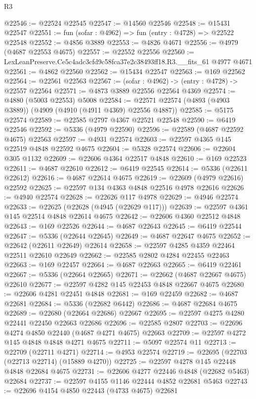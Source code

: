 \begin{lexlean}{R3}
\begin{coremodule}
@22546 := @22524 @22545
@22547 := @14560 @22546
@22548 := @15431 @22547
@22551 := fun (sofar : @4962) => fun (entry : @4728) => @22522 @22548
@22552 := @4856 @3889
@22553 := @4826 @4671
@22556 := @4979 (@4687 @22553 @4675)
@22557 := @22552 @22556
@22560 := LexLeanPreserve.Ce5c4adc3cfd9c58fca37e2c38493ff18.R3.__fits_61 @4977 @4671
@22561 := @4862 @22560
@22562 := @15434 @22547
@22563 := @169 @22562
@22564 := @22561 @22563
@22567 := (sofar : @4962) -> (entry : @4728) -> @22557 @22564
@22571 := @4873 @3889 @22556 @22564 @4369
@22574 := @4880 (@5003 @22553) @5008
@22584 := @22571 @22574 (@4893 (@4903 @3889)) (@4909 (@4910 (@4911 @4369) @22556 @4887))
@22585 := @5175 @22574
@22589 := @22585 @2797 @4367 @22521 @22548
@22590 := @6419 @22546
@22592 := @5336 (@4979 @22590)
@22596 := @22589 (@4687 @22592 @4675) @22563
@22597 := @4931 @22574
@22603 := @22597 @4365 @145 @22519 @4848 @22592 @4675
@22604 := @5328 @22574
@22606 := @22604 @305 @1132
@22609 := @22606 @4364 @22517 @4848
@22610 := @169 @22523
@22611 := @4687 @22610
@22612 := @6419 @22545
@22614 := @5336 (@22611 @22612)
@22616 := @4687 @22614 @4675
@22619 := @22609 (@4979 @22616) @22592
@22625 := @22597 @134 @4363 @4848 @22516 @4978 @22616
@22626 := @4940 @22574
@22628 := @22626 @117 @4978
@22629 := @4946 @22574
@22633 := @22625 (@22628 (@4945 (@22629 @117)))
@22639 := @22597 @4361 @145 @22514 @4848 @22614 @4675
@22642 := @22606 @4360 @22512 @4848
@22643 := @169 @22526
@22644 := @4687 @22643
@22645 := @6419 @22544
@22647 := @5336 (@22644 @22645)
@22649 := @4687 @22647 @4675
@22652 := @22642 (@22611 @22649) @22614
@22658 := @22597 @4285 @4359 @22464 @22511 @22610 @22649
@22662 := @22585 @2802 @4284 @22455 @22463
@22663 := @169 @22457
@22664 := @4687 @22663
@22665 := @6419 @22461
@22667 := @5336 (@22664 @22665)
@22671 := @22662 (@4687 @22667 @4675) @22610
@22677 := @22597 @4282 @145 @22453 @4848 @22667 @4675
@22680 := @22606 @4281 @22451 @4848
@22681 := @169 @22459
@22682 := @4687 @22681
@22684 := @5336 (@22682 @6442)
@22686 := @4687 @22684 @4675
@22689 := @22680 (@22664 @22686) @22667
@22695 := @22597 @4275 @4280 @22441 @22450 @22663 @22686
@22696 := @22585 @2807
@22703 := @22696 @4274 @4850 @22440 (@4687 @4271 @4675) @22663
@22709 := @22597 @4272 @145 @4848 @4848 @4271 @4675
@22711 := @5097 @22574 @11
@22713 := @22709 (@22711 @4271)
@22714 := @4953 @22574
@22719 := @22695 (@22703 (@22713 @22714) (@15889 @4270))
@22725 := @22597 @4278 @145 @22448 @4848 @22684 @4675
@22731 := @22606 @4277 @22446 @4848 (@22682 @5463) @22684
@22737 := @22597 @4155 @1146 @22444 @4852 @22681 @5463
@22743 := @22696 @4154 @4850 @22443 (@4733 @4675) @22681

\end{coremodule}
\end{lexlean}
